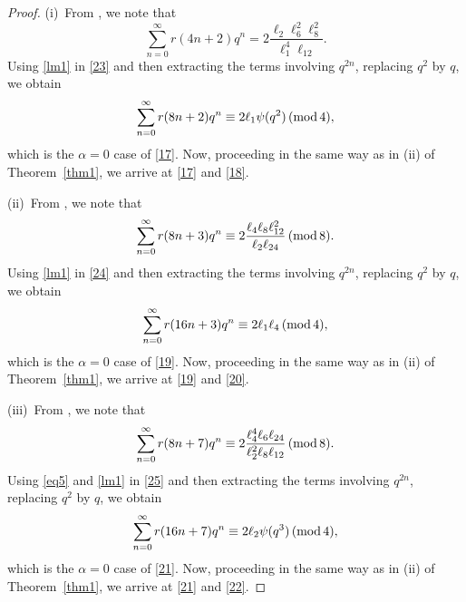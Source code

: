 \documentclass[12pt]{article}
\renewcommand{\(}{\left\(}
\renewcommand{\)}{\right\)}
\renewcommand{\[}{\left[}
\renewcommand{\]}{\right]}
\renewcommand{\pmod}[1]{\,(\textup{mod}\,#1)}
\numberwithin{equation}{section}
\theoremstyle{plain}
\begin{document}
\begin{proof}
(i)~From \cite[p.21 Theorem 16]{GM1}, we note that
\begin{equation}\label{23}
\sum_{n=0}^{\infty} r(4n+2)q^n=2\dfrac{\ell_2\ell_6^2\ell_8^2}{\ell_1^4\ell_{12}}.
\end{equation}Using \eqref{lm1} in \eqref{23} and then extracting the terms involving $q^{2n}$, replacing $q^2$ by $q$, we obtain
$$\sum_{n=0}^{\infty} r(8n+2)q^n\equiv2\ell_1\psi(q^2)\pmod{4},$$which is the $\alpha=0$ case of \eqref{17}. Now, proceeding in the same way as in (ii) of Theorem~\ref{thm1}, we arrive at \eqref{17} and \eqref{18}.

(ii)~From \cite[p.22 Theorem 16]{GM1}, we note that
\begin{equation}\label{24}
\sum_{n=0}^{\infty} r(8n+3)q^n\equiv 2\dfrac{\ell_4\ell_8\ell_{12}^2}{\ell_2\ell_{24}}\pmod{8}.
\end{equation}Using \eqref{lm1} in \eqref{24} and then extracting the terms involving $q^{2n}$, replacing $q^2$ by $q$, we obtain
$$\sum_{n=0}^{\infty} r(16n+3)q^n\equiv 2\ell_1\ell_4\pmod{4},$$which is the $\alpha=0$ case of \eqref{19}. Now, proceeding in the same way as in (ii) of Theorem~\ref{thm1}, we arrive at \eqref{19} and \eqref{20}.

(iii)~From \cite[p.22 Theorem 16]{GM1}, we note that
\begin{equation}\label{25}
\sum_{n=0}^{\infty} r(8n+7)q^n\equiv 2\dfrac{\ell_4^4\ell_6\ell_{24}}{\ell_2^2\ell_8\ell_{12}}\pmod{8}.
\end{equation}Using \eqref{eq5} and \eqref{lm1} in \eqref{25} and then extracting the terms involving $q^{2n}$, replacing $q^2$ by $q$, we obtain
$$\sum_{n=0}^{\infty} r(16n+7)q^n\equiv 2\ell_2\psi(q^3)\pmod{4},$$which is the $\alpha=0$ case of \eqref{21}. Now, proceeding in the same way as in (ii) of Theorem~\ref{thm1}, we arrive at \eqref{21} and \eqref{22}.
\end{proof}
\end{document}

